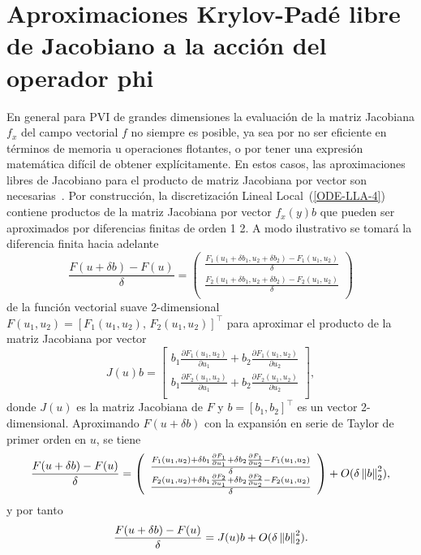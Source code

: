 \section{Aproximaciones Krylov-Padé libre de Jacobiano a la acción del operador phi} \label{section:fj-krylov-pade-approx}
En general para PVI de grandes dimensiones la evaluación de la matriz Jacobiana $f_x$ del campo vectorial $f$ no siempre es posible, ya sea por no ser eficiente en términos de memoria u operaciones flotantes, o por tener una expresión matemática difícil de obtener explícitamente. En estos casos, las aproximaciones libres de Jacobiano para el producto de matriz Jacobiana por vector son necesarias~\cite{al2009complex,knoll2004jacobian}. Por construcción, la discretización Lineal Local~(\ref{ODE-LLA-4}) contiene productos de la matriz Jacobiana por vector $f_x(y)b$ que pueden ser aproximados por diferencias finitas de orden 1  2. A modo ilustrativo se tomará la diferencia finita hacia adelante
\begin{equation*}
	\frac{F(u+\delta b)-F(u)}{\delta} =  \left(\begin{array}{c}
		\frac{F_1(u_1+\delta b_1,u_2+\delta b_2)-F_1(u_1,u_2)}{\delta}\\
		\frac{F_2(u_1+\delta b_1,u_2+\delta b_2)-F_2(u_1,u_2)}{\delta}\\
	\end{array}\right)
\end{equation*}
de la función vectorial suave 2-dimensional $F(u_1,u_2)=[F_1(u_1,u_2),\,F_2(u_1,u_2)]^{\intercal}$ para aproximar el producto de la matriz Jacobiana por vector \begin{equation*}
	J(u)b = \left[\begin{array}{c}
		b_1\frac{\partial F_1(u_1,u_2)}{\partial u_1} + b_2\frac{\partial F_1(u_1,u_2)}{\partial u_2}\\
		b_1\frac{\partial F_2(u_1,u_2)}{\partial u_1} + b_2\frac{\partial F_2(u_1,u_2)}{\partial u_2}\\
	\end{array}\right],
\end{equation*}
donde $J(u)$ es la matriz Jacobiana de $F$ y $b=[b_1,b_2]^{\intercal}$ es un vector 2-dimensional. Aproximando $F(u+\delta b)$ con la expansión en serie de Taylor de primer orden en $u$, se tiene
\begin{equation*}
	\frac{F(u+\delta b)-F(u)}{\delta} =  \left(\begin{array}{c}
		\frac{F_1(u_1,u_2) + \delta b_1 \frac{\partial F_1}{\partial u_1} + \delta b_2 \frac{\partial F_1}{\partial u_2} -F_1(u_1,u_2)}{\delta}\\
		\frac{F_2(u_1,u_2) + \delta b_1 \frac{\partial F_2}{\partial u_1} + \delta b_2 \frac{\partial F_2}{\partial u_2} -F_2(u_1,u_2)}{\delta}\\
	\end{array}\right)  + O(\delta\left\lVert b \right\rVert_2^2),
\end{equation*}
y por tanto
\begin{equation*}
	\frac{F(u+\delta b)-F(u)}{\delta} =  J(u)b + O(\delta\left\lVert b \right\rVert_2^2).
\end{equation*}

